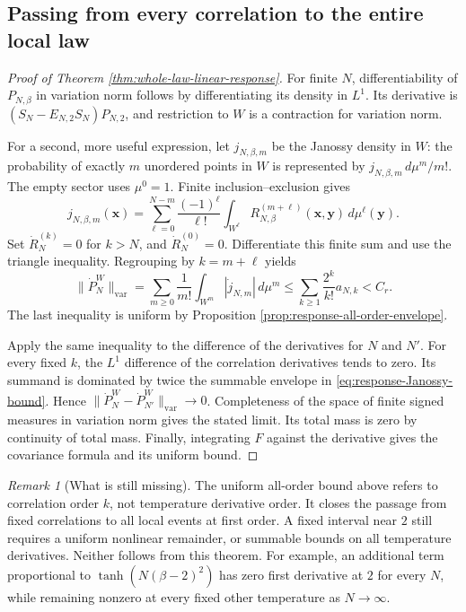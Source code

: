 \documentclass[11pt]{article}
\theoremstyle{remark}\newtheorem{remark}[theorem]{Remark}
\begin{document}
\subsection{Passing from every correlation to the entire local law}
\begin{proof}[Proof of Theorem \ref{thm:whole-law-linear-response}]
For finite $N$, differentiability of $P_{N,\beta}$ in variation norm
follows by differentiating its density in $L^1$. Its derivative is
$(S_N-E_{N,2}S_N)P_{N,2}$, and restriction to $W$ is a contraction for
variation norm.

For a second, more useful expression, let $j_{N,\beta,m}$ be the Janossy
density in $W$: the probability of exactly $m$ unordered points in $W$
is represented by $j_{N,\beta,m}\,d\mu^m/m!$. The empty sector uses
$\mu^0=1$. Finite inclusion--exclusion gives
\[
 j_{N,\beta,m}(\mathbf x)
 =\sum_{\ell=0}^{N-m}\frac{(-1)^\ell}{\ell!}
       \int_{W^\ell}R_{N,\beta}^{(m+\ell)}(\mathbf x,\mathbf y)
           \,d\mu^\ell(\mathbf y).
\]
Set $\dot R_N^{(k)}=0$ for $k>N$, and $\dot R_N^{(0)}=0$. Differentiate
this finite sum and use the triangle inequality. Regrouping by
$k=m+\ell$ yields
\begin{equation}\label{eq:response-Janossy-bound}
 \|\dot P_N^W\|_{\mathrm{var}}
  =\sum_{m\ge0}\frac1{m!}\int_{W^m}|\dot j_{N,m}|\,d\mu^m
  \le\sum_{k\ge1}\frac{2^k}{k!}a_{N,k}<C_r.
\end{equation}
The last inequality is uniform by Proposition
\ref{prop:response-all-order-envelope}.

Apply the same inequality to the difference of the derivatives for $N$
and $N'$. For every fixed $k$, the $L^1$ difference of the correlation
derivatives tends to zero. Its summand is dominated by twice the
summable envelope in \eqref{eq:response-Janossy-bound}. Hence
$\|\dot P_N^W-\dot P_{N'}^W\|_{\mathrm{var}}\to0$. Completeness of
the space of finite signed measures in variation norm gives the stated
limit. Its total mass is zero by continuity of total mass. Finally,
integrating $F$ against the derivative gives the covariance formula and
its uniform bound.
\end{proof}

\begin{remark}[What is still missing]
The uniform all-order bound above refers to correlation order $k$, not
temperature derivative order. It closes the passage from fixed
correlations to all local events at first order. A fixed interval near
$2$ still requires a uniform nonlinear remainder, or summable bounds on
all temperature derivatives. Neither follows from this theorem. For
example, an additional term proportional to $\tanh(N(\beta-2)^2)$ has
zero first derivative at $2$ for every $N$, while remaining nonzero at
every fixed other temperature as $N\to\infty$.
\end{remark}
\end{document}
